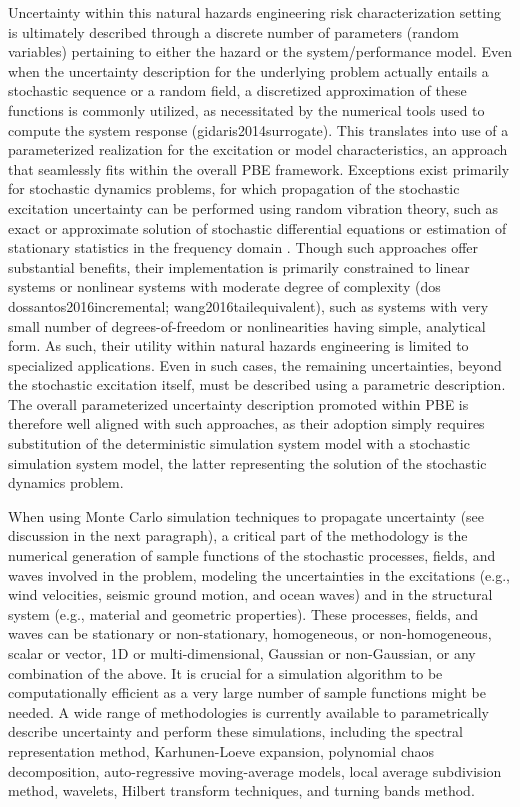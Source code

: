 Uncertainty within this natural hazards engineering risk characterization setting is ultimately described through a discrete number of parameters (random variables) pertaining to either the hazard or the system/performance model. Even when the uncertainty description for the underlying problem actually entails a stochastic sequence or a random field, a discretized approximation of these functions is commonly utilized, as necessitated by the numerical tools used to compute the system response (gidaris2014surrogate). This translates into use of a parameterized realization for the excitation or model characteristics, an approach that seamlessly fits within the overall PBE framework. Exceptions exist primarily for stochastic dynamics problems, for which propagation of the stochastic excitation uncertainty can be performed using random vibration theory, such as exact or approximate solution of stochastic differential equations or estimation of stationary statistics in the frequency domain \citep{li2009stochastic}. Though such approaches offer substantial benefits, their implementation is primarily constrained to linear systems or nonlinear systems with moderate degree of complexity (dos dossantos2016incremental; wang2016tailequivalent), such as systems with very small number of degrees-of-freedom or nonlinearities having simple, analytical form. As such, their utility within natural hazards engineering is limited to specialized applications. Even in such cases, the remaining uncertainties, beyond the stochastic excitation itself, must be described using a parametric description. The overall parameterized uncertainty description promoted within PBE is therefore well aligned with such approaches, as their adoption simply requires substitution of the deterministic simulation system model with a stochastic simulation system model, the latter representing the solution of the stochastic dynamics problem.

When using Monte Carlo simulation techniques to propagate uncertainty (see discussion in the next paragraph), a critical part of the methodology is the numerical generation of sample functions of the stochastic processes, fields, and waves involved in the problem, modeling the uncertainties in the excitations (e.g., wind velocities, seismic ground motion, and ocean waves) and in the structural system (e.g., material and geometric properties). These processes, fields, and waves can be stationary or non-stationary, homogeneous, or non-homogeneous, scalar or vector, 1D or multi-dimensional, Gaussian or non-Gaussian, or any combination of the above. It is crucial for a simulation algorithm to be computationally efficient as a very large number of sample functions might be needed. A wide range of methodologies is currently available to parametrically describe uncertainty and perform these simulations, including the spectral representation method, Karhunen-Loeve expansion, polynomial chaos decomposition, auto-regressive moving-average models, local average subdivision method, wavelets, Hilbert transform techniques, and turning bands method.

